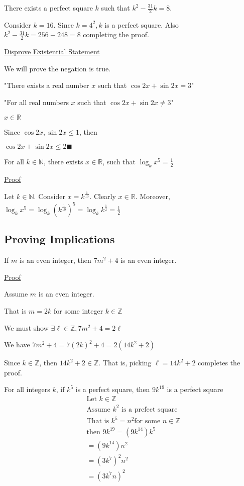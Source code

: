 \documentclass{article}
\begin{document}
There exists a perfect square $k$ such that $k^2 - \frac{31}{2}k = 8$.

Consider $k = 16$. Since $k=4^2, k$ is a perfect square. Also $k^2 - \frac{31}{2}k = 256 - 248 = 8$ completing the proof.

\underline{Disprove Existential Statement}

We will prove the negation is true.

"There exists a real number $x$ such that $\cos2x + \sin2x = 3$"

"For all real numbers $x$ such that $\cos2x + \sin2x \ne 3$"

$x \in \mathbb{R}$

Since $\cos2x, \sin2x \le 1$, then

$\cos2x + \sin2x \le 2 \blacksquare$


For all $k \in \mathbb{N}$, there exists $x \in \mathbb{R}$, such that $\log_kx^5 = \frac{1}{2}$

\underline{Proof}

Let $k \in \mathbb{N}$. Consider $x = k^{\frac{1}{10}}$. Clearly $x \in \mathbb{R}$. Moreover, $\log_kx^5 = \log_k(k^{\frac{1}{10}})^5 = \log_kk^{\frac{1}{2}} = \frac{1}{2}$


\subsection{Proving Implications}

If $m$ is an even integer, then $7m^2 + 4$ is an even integer. 

\underline{Proof}

Assume $m$ is an even integer.

That is $m = 2k$ for some integer $k \in \mathbb{Z}$

We must show $\exists \ell \in \mathbb{Z}, 7m^2 + 4 = 2\ell$

We have $7m^2 + 4 = 7(2k)^2 + 4 = 2(14k^2 + 2)$

Since $k \in \mathbb{Z}$, then $14k^2 + 2 \in \mathbb{Z}$. That is, picking $\ell = 14k^2 + 2$ completes the proof.

For all integers $k$, if $k^5$ is a perfect square, then $9k^19$ is a perfect square
\begin{align*}
    &\text{Let } k \in \mathbb{Z} \\
    &\text{Assume } k^2 \text{ is a prefect square} \\
    &\text{That is } k^5 = n^2 \text{for some } n \in \mathbb{Z} \\
    &\text{then } 9k^{19} = (9k^{14})k^5 \\
    &= (9k^{14})n^2 \\
    &= (3k^7)^2 n^2 \\
    &= (3k^7n)^2
\end{align*}
\end{document}
